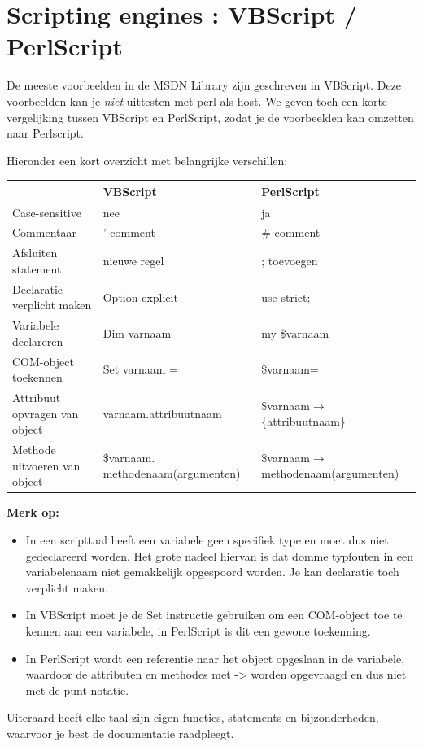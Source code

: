 \documentclass[11pt,a4paper]{report}
\begin{document}
\section{Scripting engines : VBScript / PerlScript}
De meeste voorbeelden in de MSDN Library zijn geschreven in VBScript. Deze voorbeelden kan je \textit{niet} uittesten met perl als host. We geven toch een korte vergelijking tussen VBScript en PerlScript, zodat je de voorbeelden kan omzetten naar Perlscript.
\par Hieronder een kort overzicht met belangrijke verschillen:\\
\begin{tabular}{|l|l|l|}
	\hline  & \textbf{VBScript} & \textbf{PerlScript} \\ 
	\hline  Case-sensitive & nee & ja \\ 
	\hline  Commentaar & ' comment & \# comment \\ 
	\hline  Afsluiten statement & nieuwe regel & ; toevoegen \\ 
	\hline  Declaratie verplicht maken & Option explicit & use strict; \\ 
	\hline  Variabele declareren & Dim varnaam & my \$varnaam \\ 
	\hline  COM-object toekennen & Set varnaam = & \$varnaam= \\ 
	\hline  Attribuut opvragen van object & varnaam.attribuutnaam & \$varnaam$\rightarrow$\{attribuutnaam\} \\ 
	\hline  Methode uitvoeren van object & \parbox[t]{5cm}{\$varnaam.\\methodenaam(argumenten)} &
	\parbox[t]{5cm}{\$varnaam$\rightarrow$\\methodenaam(argumenten)} \\
	\hline 
\end{tabular} 
\par \textbf{Merk op:}
\begin{itemize} 
	\item In een scripttaal heeft een variabele geen specifiek type en moet dus niet gedeclareerd worden. Het grote nadeel hiervan is dat domme typfouten in een variabelenaam niet gemakkelijk opgespoord worden. Je kan declaratie toch verplicht maken.
	\item In VBScript moet je de Set instructie gebruiken om een COM-object toe te kennen aan een variabele, in PerlScript is dit een gewone toekenning.
	\item In PerlScript wordt een referentie naar het object opgeslaan in de variabele, waardoor de attributen en methodes met -> worden opgevraagd en dus niet met de punt-notatie.
\end{itemize}
Uiteraard heeft elke taal zijn eigen functies, statements en bijzonderheden, waarvoor je best de documentatie raadpleegt. 
\end{document}
